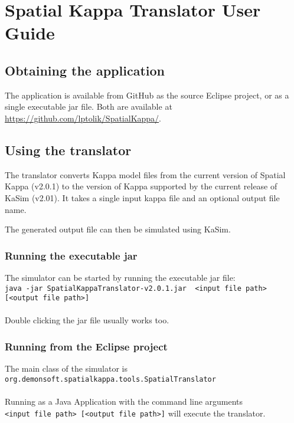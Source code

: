 \chapter{Spatial Kappa Translator User Guide}

\section{Obtaining the application}

The application is available from GitHub as the source Eclipse project, or as a single executable jar file. Both are available at \url{https://github.com/lptolik/SpatialKappa/}.

\section{Using the translator}

The translator converts Kappa model files from the current version of Spatial Kappa (v2.0.1) to the version of Kappa supported by the current release of KaSim (v2.01). It takes a single input kappa file and an optional output file name.

The generated output file can then be simulated using KaSim.

\subsection{Running the executable jar}

The simulator can be started by running the executable jar file:\\
\verb|java -jar SpatialKappaTranslator-v2.0.1.jar  <input file path> [<output file path>]|\\\\
Double clicking the jar file usually works too.

\subsection{Running from the Eclipse project}

The main class of the simulator is \\
\verb|org.demonsoft.spatialkappa.tools.SpatialTranslator|\\\\
Running as a Java Application with the command line arguments\\ \verb|<input file path> [<output file path>]| will execute the translator.

